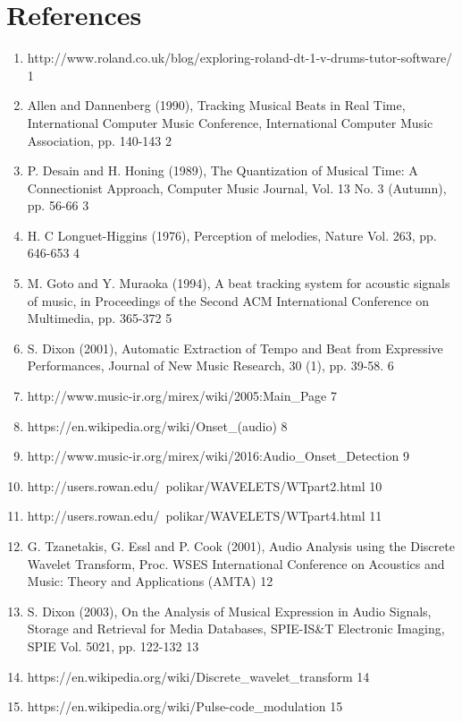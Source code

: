 \documentclass[a4paper, 11pt]{article}
\begin{document}
\maketitle{} 
\section{References}
\begin{enumerate}
\item http://www.roland.co.uk/blog/exploring-roland-dt-1-v-drums-tutor-software/ 1
\item Allen and Dannenberg (1990), Tracking Musical Beats in Real Time, International Computer Music Conference, International Computer Music Association, pp. 140-143 2
\item P. Desain and H. Honing (1989), The Quantization of Musical Time: A Connectionist Approach, Computer Music Journal, Vol. 13 No. 3 (Autumn), pp. 56-66 3
\item H. C Longuet-Higgins (1976), Perception of melodies, Nature Vol. 263, pp. 646-653 4
\item M. Goto and Y. Muraoka (1994), A beat tracking system for acoustic signals of music, in Proceedings of the Second ACM International Conference on Multimedia, pp. 365-372 5
\item S. Dixon (2001), Automatic Extraction of Tempo and Beat from Expressive Performances, Journal of New Music Research, 30 (1), pp. 39-58. 6
\item http://www.music-ir.org/mirex/wiki/2005:Main\_Page 7
\item https://en.wikipedia.org/wiki/Onset\_(audio) 8
\item http://www.music-ir.org/mirex/wiki/2016:Audio\_Onset\_Detection 9
\item http://users.rowan.edu/~polikar/WAVELETS/WTpart2.html 10 
\item http://users.rowan.edu/~polikar/WAVELETS/WTpart4.html 11
\item G. Tzanetakis, G. Essl and P. Cook (2001), Audio Analysis using the Discrete Wavelet Transform, Proc. WSES International Conference on Acoustics and Music: Theory and Applications (AMTA) 12
\item S. Dixon (2003), On the Analysis of Musical Expression in Audio Signals, Storage and Retrieval for Media Databases, SPIE-IS\&T Electronic Imaging, SPIE Vol. 5021, pp. 122-132 13
\item https://en.wikipedia.org/wiki/Discrete\_wavelet\_transform 14
\item https://en.wikipedia.org/wiki/Pulse-code\_modulation 15

\end{enumerate}
\end{document}
